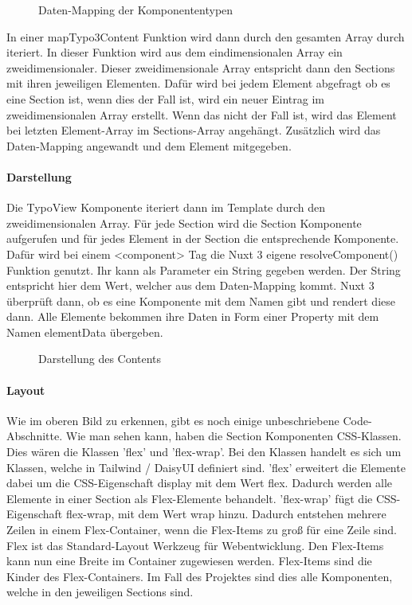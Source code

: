 \begin{figure}[htb]
\centering
{}
\caption{Daten-Mapping der Komponententypen}
\end{figure}

In einer mapTypo3Content Funktion wird dann durch den gesamten Array durch iteriert. In dieser Funktion wird aus dem eindimensionalen Array ein zweidimensionaler. Dieser zweidimensionale Array entspricht dann den Sections mit ihren jeweiligen Elementen. Dafür wird bei jedem Element abgefragt ob es eine Section ist, wenn dies der Fall ist, wird ein neuer Eintrag im zweidimensionalen Array erstellt. Wenn das nicht der Fall ist, wird das Element bei letzten Element-Array im Sections-Array angehängt. Zusätzlich wird das Daten-Mapping angewandt und dem Element mitgegeben. 

\paragraph{Darstellung}
Die TypoView Komponente iteriert dann im Template durch den zweidimensionalen Array. Für jede Section wird die Section Komponente aufgerufen und für jedes Element in der Section die entsprechende Komponente. Dafür wird bei einem <component> Tag die Nuxt 3 eigene resolveComponent() Funktion genutzt. Ihr kann als Parameter ein String gegeben werden. Der String entspricht hier dem Wert, welcher aus dem Daten-Mapping kommt. Nuxt 3 überprüft dann, ob es eine Komponente mit dem Namen gibt und rendert diese dann. Alle Elemente bekommen ihre Daten in Form einer Property mit dem Namen elementData übergeben.

\begin{figure}[htb]
\centering
{}
\caption{Darstellung des Contents}
\end{figure}


\paragraph{Layout}

Wie im oberen Bild zu erkennen, gibt es noch einige unbeschriebene Code-Abschnitte. Wie man sehen kann, haben die Section Komponenten CSS-Klassen. Dies wären die Klassen 'flex' und 'flex-wrap'. Bei den Klassen handelt es sich um Klassen, welche in Tailwind / DaisyUI definiert sind. 'flex' erweitert die Elemente dabei um die CSS-Eigenschaft display mit dem Wert flex. Dadurch werden alle Elemente in einer Section als Flex-Elemente behandelt. 'flex-wrap' fügt die CSS-Eigenschaft flex-wrap, mit dem Wert wrap hinzu. Dadurch entstehen mehrere Zeilen in einem Flex-Container, wenn die Flex-Items zu groß für eine Zeile sind. Flex ist das Standard-Layout Werkzeug für Webentwicklung. Den Flex-Items kann nun eine Breite im Container zugewiesen werden. Flex-Items sind die Kinder des Flex-Containers. Im Fall des Projektes sind dies alle Komponenten, welche in den jeweiligen Sections sind. 

